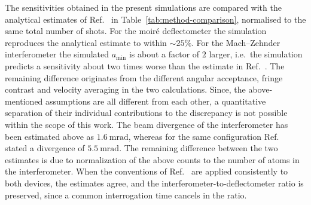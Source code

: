 \documentclass[12pt]{report}
\begin{document}
% 
The sensitivities obtained in the present simulations are compared with the analytical estimates of Ref.~\cite{Mariazzi_Caravita_Doser_Nebbia_Brusa_2020} in Table~\ref{tab:method-comparison}, normalised to the same total number of shots. For the moir\'e deflectometer the simulation reproduces the analytical estimate to within $\sim25\%$. For the Mach--Zehnder interferometer the simulated $a_{\min}$ is about a factor of $2$ larger, i.e.\ the simulation predicts a sensitivity about two times worse than the estimate in Ref.~\cite{Mariazzi_Caravita_Doser_Nebbia_Brusa_2020}. 
The remaining difference originates from the different angular acceptance, fringe contrast and velocity averaging in the two calculations. Since, the above-mentioned assumptions are all different from each other, a quantitative separation of their individual contributions to the discrepancy is not possible within the scope of this work.
%
The beam divergence of the interferometer has been estimated above as $1.6~\mathrm{mrad}$, whereas for the same configuration Ref.~\cite{Mariazzi_Caravita_Doser_Nebbia_Brusa_2020} stated a divergence of $5.5~\mathrm{mrad}$. The remaining difference between the two estimates is due to normalization of the above counts to the number of atoms in the interferometer. When the conventions of Ref.~\cite{Mariazzi_Caravita_Doser_Nebbia_Brusa_2020} are applied consistently to both devices, the estimates agree, and the interferometer-to-deflectometer ratio is preserved, since a common interrogation time cancels in the ratio.
\end{document}
